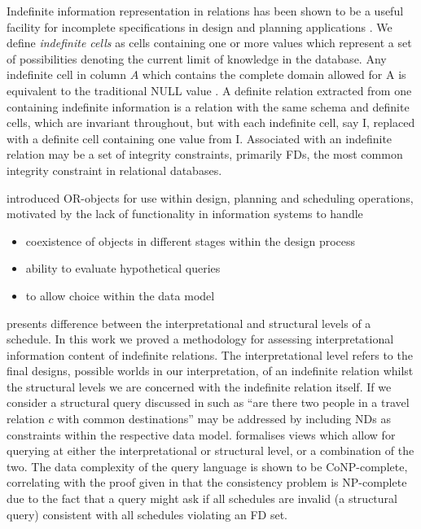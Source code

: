 Indefinite information representation in relations has been shown to be 
a useful facility for incomplete specifications in design and planning
applications \cite{inv91,ivv95,vn95}. We define {\em indefinite cells} as cells
containing one or more values which represent a set of possibilities denoting
 the current limit of knowledge in the database. Any indefinite cell in 
column $A$ which contains the complete domain allowed for A is equivalent to
the traditional NULL value \cite{lip79}.
 A definite relation extracted from
one containing indefinite information is a relation with the same schema
and definite cells, which are invariant throughout, but with each indefinite
cell, say I, replaced with a definite cell containing one value from I.  
Associated with an indefinite
relation may be a set of integrity constraints, primarily FDs, the
most common integrity constraint in relational databases. 
\medskip


\cite{inv91} introduced OR-objects for use within design, planning and
scheduling operations, motivated by the lack of functionality in
information systems to handle
\begin{itemize}
\item coexistence of objects in different stages within the design
process
\item ability to evaluate hypothetical queries
\item to allow choice within the data model
\end{itemize}

\cite{inv91} presents difference between the interpretational and
structural levels of a schedule. In this work we proved a methodology
for assessing interpretational information content of indefinite
relations. The interpretational level refers to the final designs,
possible worlds in our interpretation, of an indefinite relation
whilst the structural levels we are concerned with the indefinite
relation itself. If we consider a structural query discussed in
\cite{inv91} such as ``are there two people in a travel relation $c$
with common destinations'' may be addressed by including NDs as
constraints within the respective data model.  \cite{inv91} formalises
views which allow for querying at either the interpretational or
structural level, or a combination of the two. The data complexity of
the query language is shown to be CoNP-complete, correlating with the
proof given in \cite{vn95} that the consistency problem is NP-complete
due to the fact that a query might ask if all schedules are invalid (a
structural query) consistent with all schedules violating an FD set.

